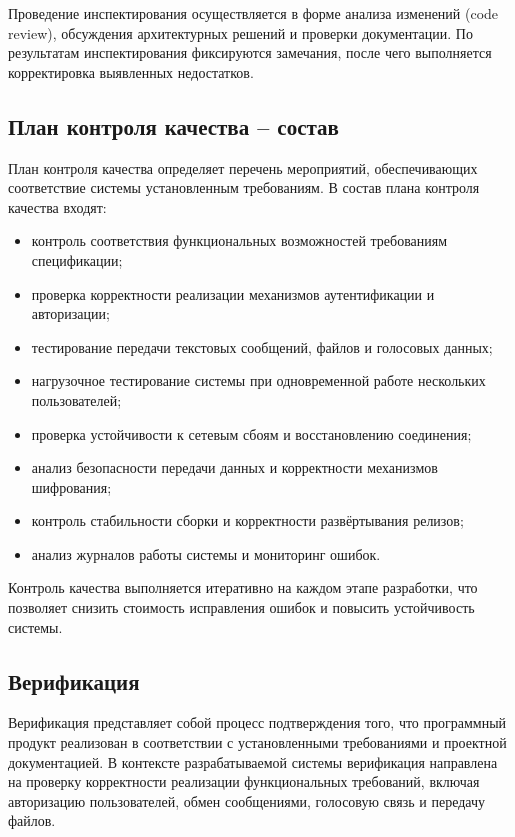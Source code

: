 \documentclass[14pt,a4paper]{extarticle}
\begin{document}
Проведение инспектирования осуществляется в форме анализа изменений (code review), обсуждения архитектурных решений и проверки документации. По результатам инспектирования фиксируются замечания, после чего выполняется корректировка выявленных недостатков.

\subsection{План контроля качества – состав}

План контроля качества определяет перечень мероприятий, обеспечивающих соответствие системы установленным требованиям. В состав плана контроля качества входят:

\begin{itemize}
    \item контроль соответствия функциональных возможностей требованиям спецификации;
    \item проверка корректности реализации механизмов аутентификации и авторизации;
    \item тестирование передачи текстовых сообщений, файлов и голосовых данных;
    \item нагрузочное тестирование системы при одновременной работе нескольких пользователей;
    \item проверка устойчивости к сетевым сбоям и восстановлению соединения;
    \item анализ безопасности передачи данных и корректности механизмов шифрования;
    \item контроль стабильности сборки и корректности развёртывания релизов;
    \item анализ журналов работы системы и мониторинг ошибок.
\end{itemize}

Контроль качества выполняется итеративно на каждом этапе разработки, что позволяет снизить стоимость исправления ошибок и повысить устойчивость системы.

\subsection{Верификация}

Верификация представляет собой процесс подтверждения того, что программный продукт реализован в соответствии с установленными требованиями и проектной документацией. В контексте разрабатываемой системы верификация направлена на проверку корректности реализации функциональных требований, включая авторизацию пользователей, обмен сообщениями, голосовую связь и передачу файлов.
\end{document}
